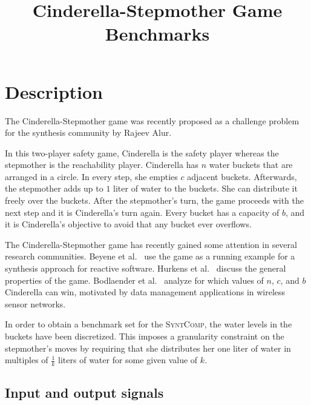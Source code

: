 \documentclass[a4paper,conference,10pt]{IEEEtran}
\author{\IEEEauthorblockN{R\"udiger Ehlers}
\IEEEauthorblockA{University of Bremen \& DFKI GmbH\\
Germany
}}
\newcommand{\SyntComp}{\textsc{SyntComp}}
\begin{document}
\title{Cinderella-Stepmother Game Benchmarks}
\maketitle

\section{Description}

\noindent The Cinderella-Stepmother game was recently proposed as a challenge problem for the synthesis community by Rajeev Alur. 

In this two-player safety game, Cinderella is the safety player whereas the stepmother is the reachability player. Cinderella has $n$ water buckets that are arranged in a circle. In every step, she empties $c$ adjacent buckets. Afterwards, the stepmother adds up to $1$ liter of water to the buckets. She can distribute it freely over the buckets. After the stepmother's turn, the game proceeds with the next step and it is Cinderella's turn again. 
Every bucket has a capacity of $b$, and it is Cinderella's objective to avoid that any bucket ever overflows.

The Cinderella-Stepmother game has recently gained some attention in several research communities.
Beyene et al.~\cite{DBLP:conf/popl/BeyeneCPR14} use the game as a running example for a synthesis approach for reactive software.
Hurkens et al.~\cite{Hurkens2011} discuss the general properties of the game.
Bodlaender et al.~\cite{DBLP:conf/ifipTCS/BodlaenderHKSWZ12} analyze for which values of $n$, $c$, and $b$ Cinderella can win, motivated by data management applications in wireless sensor networks.

In order to obtain a benchmark set for the \SyntComp, the water levels in the buckets have been discretized. This imposes  a granularity constraint on the stepmother's moves by requiring that she distributes her one liter of water in multiples of $\frac{1}{k}$ liters of water for some given value of $k$.

\subsection{Input and output signals}
\end{document}
